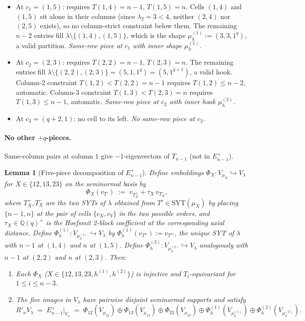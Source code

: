 \documentclass[11pt]{article}
\newtheorem{lemma}[theorem]{Lemma}
\theoremstyle{definition}
\newcommand{\SYT}{\mathrm{SYT}}
\newcommand{\Rp}{{R'}}
\begin{document}
\begin{itemize}[topsep=0.2em,itemsep=0.1em]
\item At $c_1 = (1, 5)$: requires $T(1, 4) = n-1$, $T(1, 5) = n$.
   Cells $(1, 4)$ and $(1, 5)$ sit alone in their columns
   (since $\lambda_2 = 3 < 4$, neither $(2, 4)$ nor $(2, 5)$ exists),
   so no column-strict constraint below them.  The remaining $n-2$
   entries fill $\lambda \setminus \{(1,4), (1,5)\}$, which is the
   shape $\mu_h^{(1)} := (3, 3, 1^q)$, a valid partition.
   \emph{Same-row piece at $c_1$ with inner shape $\mu_h^{(1)}$.}
\item At $c_2 = (2, 3)$: requires $T(2, 2) = n-1$, $T(2, 3) = n$.
   The remaining entries fill $\lambda \setminus \{(2,2), (2,3)\} =
   (5, 1, 1^q) = (5, 1^{q+1})$, a valid hook.  Column-$2$ constraint
   $T(1, 2) < T(2, 2) = n - 1$ requires $T(1, 2) \le n - 2$, automatic.
   Column-$3$ constraint $T(1, 3) < T(2, 3) = n$ requires
   $T(1, 3) \le n - 1$, automatic.
   \emph{Same-row piece at $c_2$ with inner hook $\mu_h^{(2)}$.}
\item At $c_3 = (q+2, 1)$: no cell to its left.
   \emph{No same-row piece at $c_3$.}
\end{itemize}

\paragraph{No other $+q$-pieces.}  Same-column pairs at column $1$ give
$-1$-eigenvectors of $T_{n-1}$ (not in $E_{n-1}^+$).

\begin{lemma}[Five-piece decomposition of $E_{n-1}^+$]\label{lem:Eplus-decomp}
Define embeddings $\Phi_X : V_{\mu_X} \hookrightarrow V_\lambda$ for
$X \in \{12, 13, 23\}$ on the seminormal basis by
\[
   \Phi_X(v_{T'}) \;:=\; v_{T_X^+} + \tau_X\,v_{T_X^-},
\]
where $T_X^+, T_X^-$ are the two SYTs of $\lambda$ obtained from
$T' \in \SYT(\mu_X)$ by placing $\{n-1, n\}$ at the pair of cells
$\{c_X, c_Y\}$ in the two possible orders, and
$\tau_X \in \mathbb{Q}(q)^\times$ is the Hoefsmit 2-block coefficient
at the corresponding axial distance.  Define
$\Phi_h^{(1)} : V_{\mu_h^{(1)}} \hookrightarrow V_\lambda$ by
$\Phi_h^{(1)}(v_{T''}) := v_{T'''}$, the unique SYT of $\lambda$ with
$n-1$ at $(1, 4)$ and $n$ at $(1, 5)$.  Define
$\Phi_h^{(2)} : V_{\mu_h^{(2)}} \hookrightarrow V_\lambda$ analogously
with $n-1$ at $(2, 2)$ and $n$ at $(2, 3)$.  Then:

\begin{enumerate}[topsep=0.3em,itemsep=0.1em,leftmargin=2em,
                  label=(\roman*)]
\item Each $\Phi_X$ ($X \in \{12, 13, 23, h^{(1)}, h^{(2)}\}$) is
   injective and $T_i$-equivariant for $1 \le i \le n - 3$.
\item The five images in $V_\lambda$ have pairwise disjoint
   seminormal supports and satisfy
   \[
       \Rp_n V_\lambda \;=\; E_{n-1}^+|_{V_\lambda}
       \;=\; \Phi_{12}(V_{\mu_{12}}) \oplus \Phi_{13}(V_{\mu_{13}})
        \oplus \Phi_{23}(V_{\mu_{23}})
        \oplus \Phi_h^{(1)}(V_{\mu_h^{(1)}})
        \oplus \Phi_h^{(2)}(V_{\mu_h^{(2)}}).
   \]
\end{enumerate}
\end{lemma}
\end{document}

